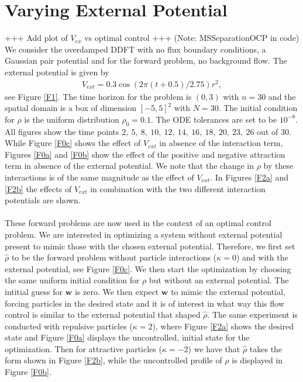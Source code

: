 \documentclass[11pt, a4paper]{article}
\theoremstyle{definition}
\newcommand{\w}{\mathbf{w}}
\newcommand{\hr}{\widehat \rho}
\begin{document}
\section{Varying External Potential} \label{sec:VaryExPotential}
+++ Add plot of $V_{ex}$ vs optimal control +++
(Note: MSSeparationOCP in code)
We consider the overdamped DDFT with no flux boundary conditions, a Gaussian pair potential and for the forward problem, no background flow. 
The external potential is given by
\begin{align*}
	V_{ext} = 0.3 \cos(2\pi (t + 0.5)/2.75)r^2,
\end{align*}
see Figure \ref{F1}. The time horizon for the problem is $(0,3)$ with $n = 30$ and the spatial domain is a box of dimension $[-5,5]^2$ with $N = 30$. The initial condition for $\rho$ is the uniform distribution $\rho_0 = 0.1$. The ODE tolerances are set to be $10^{-8}$. All figures show the time points $2,\  5,\ 8,\  10,\ 12,\ 14,\ 16,\ 18,\ 20,\ 23,\ 26$ out of $30$.
While Figure \ref{F0c} shows the effect of $V_{ext}$ in absence of the interaction term, Figures \ref{F0a} and \ref{F0b} show the effect of the positive and negative attraction term in absence of the external potential. We note that the change in $\rho$ by these interactions is of the same magnitude as the effect of $V_{ext}$. In Figures \ref{F2a} and \ref{F2b} the effects of $V_{ext}$ in combination with the two different interaction potentials are shown. 
\\
\\
These forward problems are now used in the context of an optimal control problem. We are interested in optimizing a system without external potential present to mimic those with the chosen external potential. Therefore, we first set $\hr$ to be the forward problem without particle interactions ($\kappa =0$) and with the external potential, see Figure \ref{F0c}. We then start the optimization by choosing the same uniform initial condition for $\rho$ but without an external potential. The intitial guess for $\w$ is zero. We then expect $\w$ to mimic the external potential, forcing particles in the desired state and it is of interest in what way this flow control is similar to the external potential that shaped $\hr$.
The same experiment is conducted with repulsive particles ($\kappa = 2$), where Figure \ref{F2a} shows the desired state and Figure \ref{F0a} displays the uncontrolled, initial state for the optimization. Then for attractive particles ($\kappa = -2$) we have that $\hr$ takes the form shown in Figure \ref{F2b}, while the uncontrolled profile of $\rho$ is displayed in Figure \ref{F0b}.\\
\end{document}
